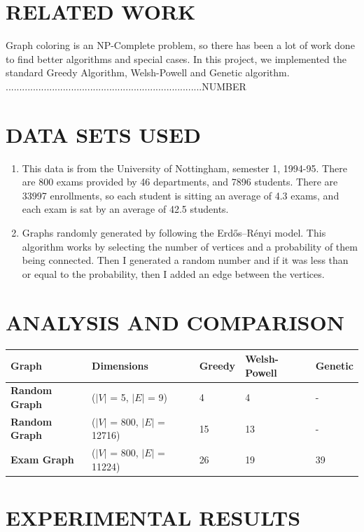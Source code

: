 \documentclass[12]{article}
\begin{document}
\section{RELATED WORK}
Graph coloring is an NP-Complete problem, so there has been a lot of work done to find better algorithms and special cases. In this project,  we implemented the standard Greedy Algorithm, Welsh-Powell and Genetic algorithm. ........................................................................NUMBER
\section{DATA SETS USED}
\begin{enumerate}
\item This data is from the University of Nottingham, semester 1, 1994-95. There are 800 exams provided by 46 departments, and 7896 students. There are 33997 enrollments, so each student is sitting an average of 4.3 exams, and each exam is sat by an average of 42.5 students.

\item Graphs randomly generated by following the Erdős–Rényi model. This algorithm works by selecting the number of vertices and a probability of them being connected. Then I generated a random number and if it was less than or equal to the probability, then I added an edge between the vertices.
\end{enumerate}
\section{ANALYSIS AND COMPARISON}
\begin{table}[H]
\centering
\begin{tabular}{|l|l|l|l|l|}
\hline
  Graph & Dimensions & \bf{Greedy}  & \bf{Welsh-Powell} &  \bf{Genetic}  \\ \hline
  \bf{Random Graph}  &($|V|$ = 5, $|E|$ = 9)  & 4  & 4 &  -  \\ \hline
\bf{Random Graph}  &($|V|$ = 800, $|E|$ = 12716)  & 15  & 13 &  -  \\ \hline
 \bf{Exam Graph}  &($|V|$ = 800, $|E|$ = 11224) & 26  & 19 &  39  \\ \hline
\end{tabular}
\end{table}
\section{EXPERIMENTAL RESULTS}
\end{document}
